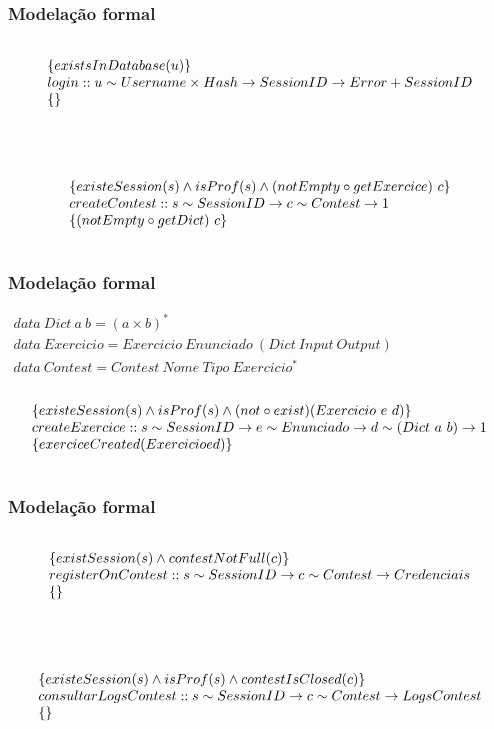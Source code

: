 \documentclass{beamer}
\begin{document}
\begin{frame} \frametitle{Modelação formal}
\begin{displaymath}
\begin{array}{l}
\prop
{existsInDatabase(u)}
{login :: u \unif Username \times Hash \rarrow SessionID \rarrow Error + SessionID}
{ }
\end{array}
\end{displaymath}
\\
\begin{displaymath}
\begin{array}{l}
\prop
{ existeSession(s)  \wedge isProf(s) \wedge (notEmpty \circ getExercice)~c}
{createContest :: s \unif SessionID \rarrow c \unif Contest \rarrow 1}
{ (notEmpty \circ getDict)~c }
\end{array}
\end{displaymath}
\end{frame}

\begin{frame} \frametitle{Modelação formal}
$\begin{array}{l}
data~Dict~a~b = (a \times b)^{*} \\
data~Exercicio = Exercicio~Enunciado~(Dict~Input~Output) \\
data~Contest =  Contest~Nome~Tipo~Exercicio^{*}
\end{array}$\\
\begin{displaymath}
\begin{array}{l}
\prop
{ existeSession(s)  \wedge isProf(s) \wedge (not \circ exist) (Exercicio~e~d)}
{createExercice :: s\unif SessionID \rarrow e \unif Enunciado \rarrow d \unif (Dict~a~b) \rarrow 1}
{ exerciceCreated(Exercicio e d) }
\end{array}
\end{displaymath}
\end{frame}

\begin{frame} \frametitle{Modelação formal}
\begin{displaymath}
\begin{array}{l}
\prop
{ existSession(s) \wedge contestNotFull(c)}
{registerOnContest :: s \unif SessionID \rarrow c\unif Contest \rarrow Credenciais}
{ }
\end{array}
\end{displaymath}
\\
\begin{displaymath}
\begin{array}{l}
\prop 
{ existeSession(s) \wedge isProf(s) \wedge contestIsClosed(c) }
{consultarLogsContest :: s \unif SessionID \rarrow c \unif Contest \rarrow LogsContest}
{}
\end{array}
\end{displaymath}
\end{frame}
\end{document}
